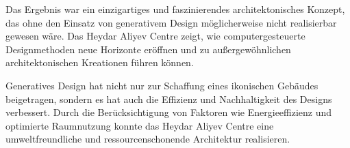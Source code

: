   Das Ergebnis war ein einzigartiges und faszinierendes architektonisches Konzept, das ohne den Einsatz von generativem Design möglicherweise nicht realisierbar gewesen wäre. Das Heydar Aliyev Centre zeigt, wie computergesteuerte Designmethoden neue Horizonte eröffnen und zu außergewöhnlichen architektonischen Kreationen führen können.
  
  Generatives Design hat nicht nur zur Schaffung eines ikonischen Gebäudes beigetragen, sondern es hat auch die Effizienz und Nachhaltigkeit des Designs verbessert. Durch die Berücksichtigung von Faktoren wie Energieeffizienz und optimierte Raumnutzung konnte das Heydar Aliyev Centre eine umweltfreundliche und ressourcenschonende Architektur realisieren.